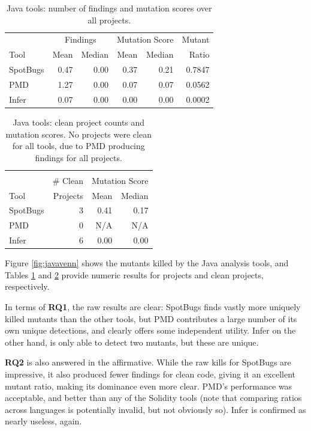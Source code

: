 \begin{table}
  \begin{tabular}{l|r|r|r|r|r}
    & \multicolumn{2}{|c|}{Findings} & \multicolumn{2}{|c|}{Mutation Score}  & Mutant \\
    Tool & Mean & Median & Mean & Median & Ratio\\
    \hline
    \hline
    SpotBugs & 0.47 & 0.00 & 0.37 & 0.21 & 0.7847 \\
    \hline
    PMD & 1.27 & 0.00 & 0.07 & 0.07 & 0.0562 \\
    \hline
    Infer & 0.07 & 0.00 & 0.00 & 0.00 &  0.0002 \\
    \hline
  \end{tabular}
  \caption{Java tools: number of findings and mutation scores over all projects.}
  \label{tab:scorejava}
\end{table}

\begin{table}
  \begin{tabular}{l|r|r|r}
    & & \multicolumn{2}{|c|}{} \\
    & \# Clean & \multicolumn{2}{|c|}{Mutation Score} \\
    Tool & Projects & Mean & Median \\
    \hline
    \hline
    SpotBugs & 3 & 0.41 & 0.17 \\
    \hline
    PMD & 0 & N/A & N/A \\
    \hline
    Infer & 6 & 0.00 & 0.00 \\
    \hline
  \end{tabular}
  \caption{Java tools: clean project counts and mutation scores.  No projects were clean for all tools, due to PMD producing findings for all projects.}
  \label{tab:cleanjava}
\end{table}

Figure \ref{fig:javavenn} shows the mutants killed by the Java analysis tools, and Tables \ref{tab:scorejava} and \ref{tab:cleanjava} provide numeric results for projects and clean projects, respectively.

In terms of {\bf RQ1}, the raw results are clear:  SpotBugs finds vastly more uniquely killed mutants than the other tools, but PMD contributes a large number of its own unique detections, and clearly offers some independent utility.  Infer on the other hand, is only able to detect two mutants, but these are unique.

{\bf RQ2} is also answered in the affirmative.  While the raw kills for SpotBugs are impressive, it also produced fewer findings for clean code, giving it an excellent mutant ratio, making its dominance even more clear.  PMD's performance was acceptable, and better than any of the Solidity tools (note that comparing ratios across languages is potentially invalid, but not obviously so).  Infer is confirmed as nearly useless, again.

